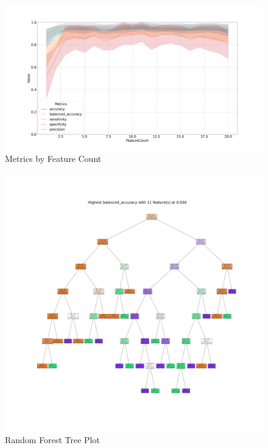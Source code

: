 \documentclass{beamer}
\begin{document}
\begin{frame}[allowframebreaks]
        \begin{figure}
            \includegraphics[width=0.8 \linewidth]{figures/RandomForest/one.DADA2.homd/metrics.png}
            \caption{Metrics by Feature Count}
        \end{figure}

        \begin{figure}
            \includegraphics[width=0.5 \linewidth]{figures/RandomForest/one.DADA2.homd/highest_balanced_accuracy.png}
            \caption{Random Forest Tree Plot}
        \end{figure}


\end{frame}
\end{document}

